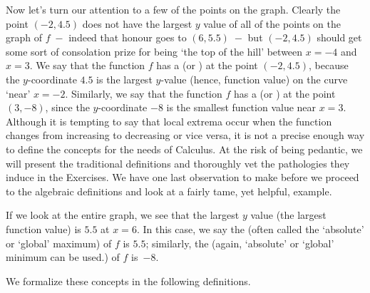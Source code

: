 Now let's turn our attention to a few of the points on the graph.  Clearly the point $(-2, 4.5)$ does not have the largest $y$ value of all of the points on the graph of $f\; -$ indeed that honour goes to $(6, 5.5)\; -$ but $(-2, 4.5)$ should get some sort of consolation prize for being `the top of the hill' between $x = -4$ and $x = 3$.  We say that the function $f$ has a  (or ) at the point $(-2,4.5)$, because the $y$-coordinate $4.5$ is the largest $y$-value (hence, function value) on the curve `near' $x=-2$.  Similarly, we say that the function $f$ has a  (or ) at the point $(3,-8)$, since the $y$-coordinate $-8$ is the smallest function value near $x=3$.  Although it is tempting to say that local extrema occur when the function changes from increasing to decreasing or vice versa, it is not a precise enough way to define the concepts for the needs of Calculus.  At the risk of being pedantic, we will present the traditional definitions and thoroughly vet the pathologies they induce in the Exercises. We have one last observation to make before we proceed to the algebraic definitions and look at a fairly tame, yet helpful, example.



\smallskip

If we look at the entire graph, we see that the largest $y$ value (the largest function value) is $5.5$ at $x=6$.  In this case, we say the  (often called the `absolute' or `global' maximum) of $f$ is $5.5$;  similarly, the  (again, `absolute' or `global' minimum can be used.) of $f$ is~$-8$.  


We formalize these concepts in the following definitions.

\medskip


